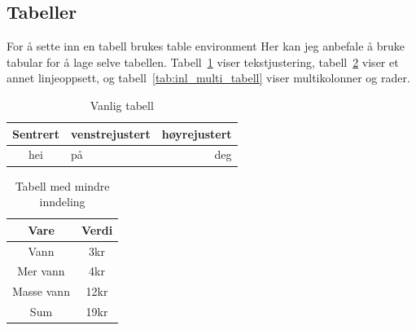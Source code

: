 \clearpage

\subsection{Tabeller}

For å sette inn en tabell brukes table environment Her kan jeg anbefale å bruke tabular for å lage selve tabellen. 
Tabell~\ref{tab:inl_full_tabell} viser tekstjustering, tabell~\ref{tab:inl_sparse_tabell} viser et annet linjeoppsett,
og tabell~\ref{tab:inl_multi_tabell} viser multikolonner og rader.

\begin{table}[!htb]
    \centering
    \caption{Vanlig tabell}
    \label{tab:inl_full_tabell}
    
    \begin{tabular}{|c|l|r|}
        \hline
        \textbf{Sentrert}   & \textbf{venstrejustert}   & \textbf{høyrejustert} \\ \hline \hline
         hei                & på                        & deg                   \\ \hline 
    \end{tabular}
\end{table}

\begin{table}[!htb]
    \centering
    \caption{Tabell med mindre inndeling}
    \label{tab:inl_sparse_tabell}
    \begin{tabular}{c|c}
        \textbf{Vare}   & \textbf{Verdi} \\ \hline
        Vann            & 3kr \\
        Mer vann        & 4kr \\
        Masse vann      & 12kr \\ \hline
        Sum             & 19kr \\
    \end{tabular}
\end{table}

